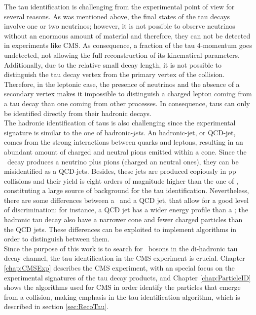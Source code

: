 \noindent The tau identification is challenging from the experimental point of view
for several reasons. As was mentioned above, the final states of the tau decays involve
one or two neutrinos; however, it is not possible to observe neutrinos without 
an enormous amount of material and therefore, they can not be detected in experiments 
like CMS. As consequence, a fraction of the tau 4-momentum goes undetected, not allowing 
the full reconstruction of its kinematical parameters. Additionally, due to the relative 
small decay length, it is not possible to distinguish the tau decay vertex from 
the primary vertex of the collision. Therefore, in the leptonic case, the presence of 
neutrinos and the absence of a secondary vertex makes it impossible 
to distinguish a charged lepton coming from a tau decay than one coming 
from other processes. In consequence, taus can only be identified directly 
from their hadronic decays. \\

The hadronic identification of taus is also challenging since 
the experimental signature is similar to the one of hadronic-\textit{jets}.
An hadronic-jet, or QCD-jet, comes from the strong interactions between 
quarks and leptons, resulting in an abundant amount of charged and neutral 
pions emitted within a cone. Since the \tauh~decay produces a neutrino 
plus pions (charged an neutral ones), they can be misidentified as a QCD-jets.
Besides, these jets are produced copiously in pp collisions and their yield is 
eight orders of magnitude higher than the one of \tauh, constituting a large
source of background for the tau identification. Nevertheless, there are some 
differences between a \tauh~and a QCD jet, that allow for a good level
of discrimination: for instance, a QCD jet has a wider energy profile than a \tauh;
the hadronic tau decay also have a narrower cone and fewer charged particles 
than the QCD jets. These differences can be exploited to implement 
algorithms in order to distinguish between them. \\

\noindent Since the purpose of this work is to search for \Zprime~bosons
in the di-hadronic tau decay channel, the tau identification in 
the CMS experiment is crucial. Chapter \ref{chap:CMSExp}
describes the CMS experiment, with an special focus on the 
experimental signatures of the tau decay products, and Chapter
\ref{chap:ParticleID} shows the algorithms used for CMS in order identify 
the particles that emerge from a collision, making emphasis 
in the tau identification algorithm, which is described in section \ref{sec:RecoTau}. \\


